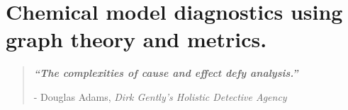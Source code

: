 \documentclass[twoside,openleft,reqno,a4paper,final]{book}
\author{Dan Ellis }
\date{March 2019}
\def\blankpage{%
      \clearpage%
      \thispagestyle{empty}%
      \addtocounter{page}{-2}%
      \null%
      \clearpage}
\def\blankpage{%
      \clearpage%
      \thispagestyle{empty}%
      \addtocounter{page}{-1}%
      \null%
      \clearpage}
\begin{document}


\titleformat{\paragraph}[hang]{\normalfont\normalsize\bfseries}{\theparagraph}{1em}{}

\setcounter{secnumdepth}{3}
\setcounter{tocdepth}{5}
\setcounter{page}{301}
\setcounter{chapter}{3}

\cleardoublepage{}
\chapter{ Chemical model diagnostics using graph theory and metrics.  }
\cleardoublepage{}
\restoregeometry
\vspace*{0.15\paperheight}


\begin{center}
\begin{quotation}
  \large{\emph{\textbf{``The complexities of cause and effect defy analysis.''} }  }  \\
  \begin{flushright}
  - Douglas Adams, \textit{Dirk Gently's Holistic Detective Agency}

  \end{flushright}
 \end{quotation}
\end{center}

\doublespacing

\setlength{\footnotesep}{0.5cm}
\raggedbottom %
\tableofcontents
\newpage
%










\newpage



% 
\end{document}
